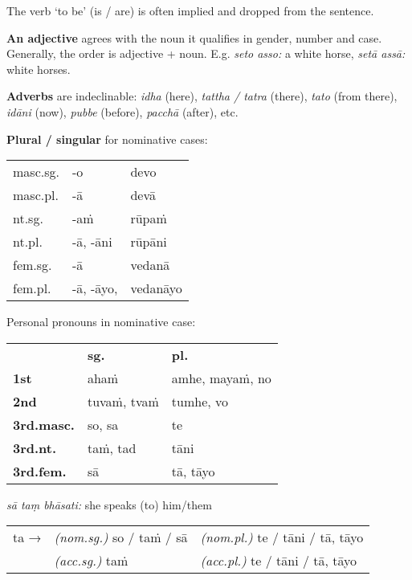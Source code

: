 \documentclass[11pt,oneside]{memoir}
\begin{document}
The verb `to be' (is / are) is often implied and dropped from the sentence.

\textbf{An adjective} agrees with the noun it qualifies in gender, number and case. \\[0pt]
Generally, the order is adjective + noun. E.g. \emph{seto asso:} a white horse, \emph{setā assā:} white horses.

\textbf{Adverbs} are indeclinable: \emph{idha} (here), \emph{tattha / tatra} (there), \emph{tato}
(from there), \emph{idāni} (now), \emph{pubbe} (before), \emph{pacchā} (after), etc.

\bigskip

\begin{multicols}{2}

\textbf{Plural / singular} for nominative cases:

\begin{center}
\begin{tabular}{lll}
masc.sg. & -o & devo\\[0pt]
masc.pl. & -ā & devā\\[0pt]
\hline
nt.sg. & -aṁ & rūpaṁ\\[0pt]
nt.pl. & -ā, -āni & rūpāni\\[0pt]
\hline
fem.sg. & -ā & vedanā\\[0pt]
fem.pl. & -ā, -āyo, & vedanāyo\\[0pt]
\end{tabular}
\end{center}

\columnbreak

Personal pronouns in nominative case:

\begin{center}
\begin{tabular}{lll}
 & \textbf{sg.} & \textbf{pl.}\\[0pt]
\textbf{1st} & ahaṁ & amhe, mayaṁ, no\\[0pt]
\textbf{2nd} & tuvaṁ, tvaṁ & tumhe, vo\\[0pt]
\textbf{3rd.masc.} & so, sa & te\\[0pt]
\textbf{3rd.nt.} & taṁ, tad & tāni\\[0pt]
\textbf{3rd.fem.} & sā & tā, tāyo\\[0pt]
\end{tabular}
\end{center}

\emph{sā taṃ bhāsati:} she speaks (to) him/them

\vspace*{-\baselineskip}

\begin{center}
\begin{tabular}{lll}
ta → & \emph{(nom.sg.)} so / taṁ / sā & \emph{(nom.pl.)} te / tāni / tā, tāyo\\[0pt]
 & \emph{(acc.sg.)} taṁ & \emph{(acc.pl.)}  te / tāni / tā, tāyo\\[0pt]
\end{tabular}
\end{center}

\end{multicols}
\bigskip
\end{document}
